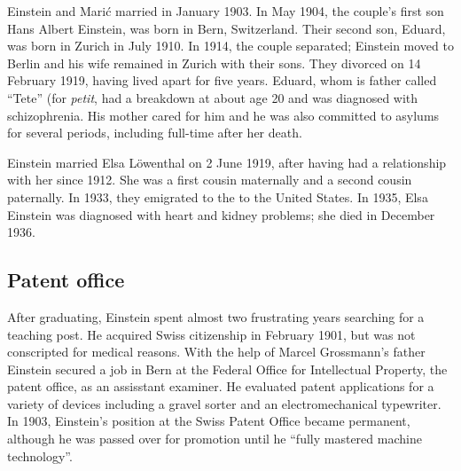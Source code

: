\documentclass[titlepage]{article}
\begin{document}
Einstein and Mari\'{c} married in January 1903. In May 1904, the couple's
first son Hans Albert Einstein, was born in Bern, Switzerland. Their
second son, Eduard, was born in Zurich in July 1910. In 1914, the couple
separated; Einstein moved to Berlin and his wife remained in Zurich
with their sons. They divorced on 14 February 1919, having lived apart
for five years. Eduard, whom is father called ``Tete'' (for \emph{petit},
had a breakdown at about age 20 and was diagnosed with schizophrenia. His
mother cared for him and he was also committed to asylums for several
periods, including full-time after her death.

Einstein married Elsa L\"{o}wenthal on 2 June 1919, after having had
a relationship with her since 1912. She was a first cousin maternally
and a second cousin paternally. In 1933, they emigrated to the to the
United States. In 1935, Elsa Einstein was diagnosed with heart and 
kidney problems; she died in December 1936.

\subsection{Patent office}

After graduating, Einstein spent almost two frustrating years searching
for a teaching post. He acquired Swiss citizenship in February 1901,
but was not conscripted for medical reasons. With the help of Marcel
Grossmann's father Einstein secured a job in Bern at the Federal Office
for Intellectual Property, the patent office, as an assisstant examiner.
He evaluated patent applications for a variety of devices including
a gravel sorter and an electromechanical typewriter. In 1903, Einstein's
position at the Swiss Patent Office became permanent, although he
was passed over for promotion until he ``fully mastered machine
technology''.
\end{document}
